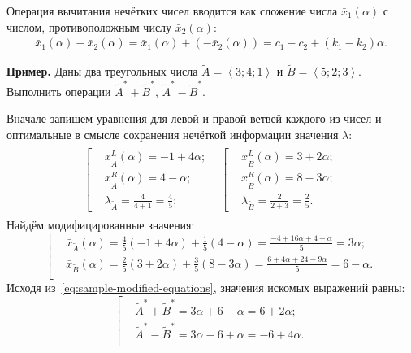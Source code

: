 Операция вычитания нечётких чисел вводится как сложение числа $\bar{x}_1\left(\alpha \right)$ с числом, противоположным числу $\bar{x}_2\left( \alpha  \right)$:
\begin{gather*}
  \bar{x}_1\left(\alpha \right)-\bar{x}_2\left(\alpha \right)=\bar{x}_1\left(\alpha \right)+\left(-\bar{x}_2\left(\alpha \right) \right)=c_1-c_2+\left( k_1-k_2 \right)\alpha.
\end{gather*}

\textbf{Пример.} Даны два треугольных числа $\tilde A=\left\langle 3;4;1 \right\rangle $ и $\tilde B=\left\langle 5;2;3 \right\rangle$. Выполнить операции $\tilde A^{*}+ \tilde B^{*}$, $\tilde A^{*}-\tilde B^{*}$.

Вначале запишем уравнения для левой и правой ветвей каждого из чисел и оптимальные в смысле сохранения нечёткой информации значения $\lambda $:
\begin{gather*}
\begin{matrix}
  \left[ \begin{aligned}
    & x_{\tilde A}^{L}\left( \alpha  \right)=-1+4\alpha;  \\ 
    & x_{\tilde A}^{R}\left( \alpha  \right)=4-\alpha;  \\ 
    & \lambda_{\tilde A}=\frac{4}{4+1}=\frac{4}{5};
  \end{aligned} \right.
  &
  \left[ \begin{aligned}
    & x_{\tilde B}^{L}\left( \alpha  \right)=3+2\alpha;  \\ 
    & x_{\tilde B}^{R}\left( \alpha  \right)=8-3\alpha;  \\ 
    & \lambda_{\tilde B}=\frac{2}{2+3}=\frac{2}{5}.
\end{aligned} \right.
\end{matrix}
\end{gather*}
Найдём модифицированные значения:
\begin{equation}
\label{eq:sample-modified-equations}
  \left[ \begin{aligned}
    & \bar{x}_{\tilde A}\left( \alpha  \right)=\frac{4}{5}\left( -1+4\alpha  \right)+\frac{1}{5}\left( 4-\alpha  \right)=\frac{-4+16\alpha +4-\alpha }{5}=3\alpha;  \\ 
    & \bar{x}_{\tilde B}\left( \alpha  \right)=\frac{2}{5}\left( 3+2\alpha  \right)+\frac{3}{5}\left( 8-3\alpha  \right)=\frac{6+4\alpha +24-9\alpha }{5}=6-\alpha.  \\ 
  \end{aligned} \right.
\end{equation}
Исходя из~\eqref{eq:sample-modified-equations}, значения искомых выражений равны:
\begin{equation*}
  \left[ \begin{aligned}
    & \tilde A^{*}+ \tilde B^{*}=3\alpha +6-\alpha =6+2\alpha; \\ 
    & \tilde A^{*}-\tilde B^{*}=3\alpha -6+\alpha =-6+4\alpha. \\ 
  \end{aligned} \right. 
\end{equation*}

